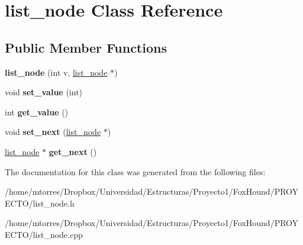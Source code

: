 \hypertarget{classlist__node}{\section{list\-\_\-node Class Reference}
\label{classlist__node}
}
\subsection*{Public Member Functions}
\begin{DoxyCompactItemize}
\item 
\hypertarget{classlist__node_a9b9ef19a716fe4a3e52f5f7b3739caf7}{{\bfseries list\-\_\-node} (int v, \hyperlink{classlist__node}{list\-\_\-node} $\ast$)}\label{classlist__node_a9b9ef19a716fe4a3e52f5f7b3739caf7}

\item 
\hypertarget{classlist__node_a775315187e361ab4dd6a8a3add2ba59c}{void {\bfseries set\-\_\-value} (int)}\label{classlist__node_a775315187e361ab4dd6a8a3add2ba59c}

\item 
\hypertarget{classlist__node_a8248fa0566e951fe9e57e3e110b73f33}{int {\bfseries get\-\_\-value} ()}\label{classlist__node_a8248fa0566e951fe9e57e3e110b73f33}

\item 
\hypertarget{classlist__node_a9808bd1c12f8265d261793b2f60b8b95}{void {\bfseries set\-\_\-next} (\hyperlink{classlist__node}{list\-\_\-node} $\ast$)}\label{classlist__node_a9808bd1c12f8265d261793b2f60b8b95}

\item 
\hypertarget{classlist__node_a8652a8e934c044a5d3e898629173c23f}{\hyperlink{classlist__node}{list\-\_\-node} $\ast$ {\bfseries get\-\_\-next} ()}\label{classlist__node_a8652a8e934c044a5d3e898629173c23f}

\end{DoxyCompactItemize}


The documentation for this class was generated from the following files\-:\begin{DoxyCompactItemize}
\item 
/home/mtorres/\-Dropbox/\-Universidad/\-Estructuras/\-Proyecto1/\-Fox\-Hound/\-P\-R\-O\-Y\-E\-C\-T\-O/list\-\_\-node.\-h\item 
/home/mtorres/\-Dropbox/\-Universidad/\-Estructuras/\-Proyecto1/\-Fox\-Hound/\-P\-R\-O\-Y\-E\-C\-T\-O/list\-\_\-node.\-cpp\end{DoxyCompactItemize}
